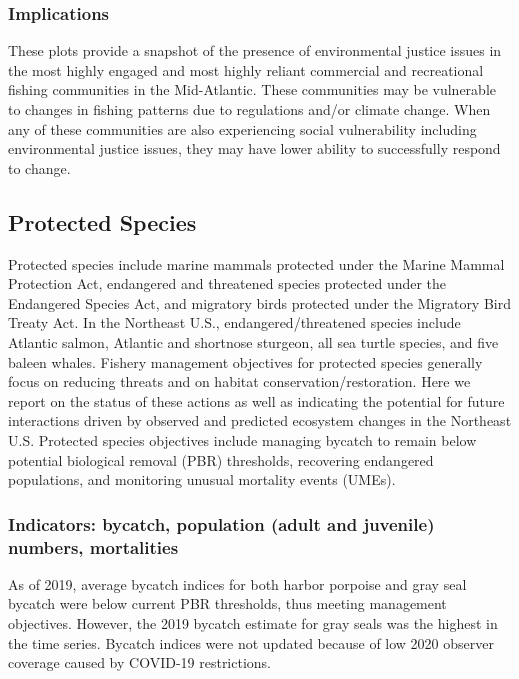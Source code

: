 \documentclass[
  10pt,
]{article}
\begin{document}
\hypertarget{implications-4}{%
\subsubsection{Implications}\label{implications-4}}

These plots provide a snapshot of the presence of environmental justice
issues in the most highly engaged and most highly reliant commercial and
recreational fishing communities in the Mid-Atlantic. These communities
may be vulnerable to changes in fishing patterns due to regulations
and/or climate change. When any of these communities are also
experiencing social vulnerability including environmental justice
issues, they may have lower ability to successfully respond to change.

\hypertarget{protected-species}{%
\subsection{Protected Species}\label{protected-species}}

Protected species include marine mammals protected under the Marine
Mammal Protection Act, endangered and threatened species protected under
the Endangered Species Act, and migratory birds protected under the
Migratory Bird Treaty Act. In the Northeast U.S., endangered/threatened
species include Atlantic salmon, Atlantic and shortnose sturgeon, all
sea turtle species, and five baleen whales. Fishery management
objectives for protected species generally focus on reducing threats and
on habitat conservation/restoration. Here we report on the status of
these actions as well as indicating the potential for future
interactions driven by observed and predicted ecosystem changes in the
Northeast U.S. Protected species objectives include managing bycatch to
remain below potential biological removal (PBR) thresholds, recovering
endangered populations, and monitoring unusual mortality events (UMEs).

\hypertarget{indicators-bycatch-population-adult-and-juvenile-numbers-mortalities}{%
\subsubsection{Indicators: bycatch, population (adult and juvenile)
numbers,
mortalities}\label{indicators-bycatch-population-adult-and-juvenile-numbers-mortalities}}

As of 2019, average bycatch indices for both harbor porpoise and gray
seal bycatch were below current PBR thresholds, thus meeting management
objectives. However, the 2019 bycatch estimate for gray seals was the
highest in the time series. Bycatch indices were not updated because of
low 2020 observer coverage caused by COVID-19 restrictions.
\end{document}
